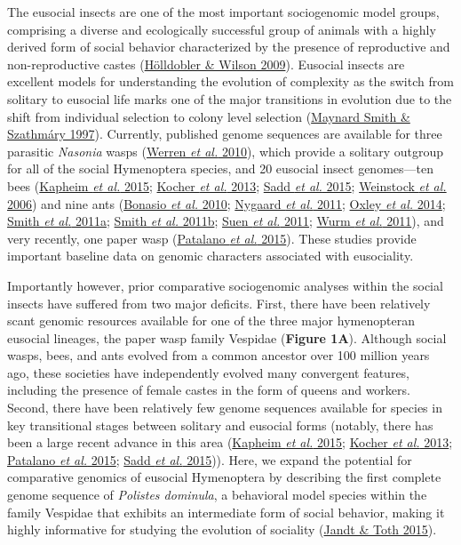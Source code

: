 \documentclass[]{article}
\begin{document}
The eusocial insects are one of the most important sociogenomic model
groups, comprising a diverse and ecologically successful group of
animals with a highly derived form of social behavior characterized by
the presence of reproductive and non-reproductive castes
(\protect\hyperlink{ux5fENREFux5f19}{Hölldobler \& Wilson 2009}).
Eusocial insects are excellent models for understanding the evolution of
complexity as the switch from solitary to eusocial life marks one of the
major transitions in evolution due to the shift from individual
selection to colony level selection
(\protect\hyperlink{ux5fENREFux5f35}{Maynard Smith \& Szathmáry 1997}).
Currently, published genome sequences are available for three parasitic
\emph{Nasonia} wasps (\protect\hyperlink{ux5fENREFux5f70}{Werren
\emph{et al.} 2010}), which provide a solitary outgroup for all of the
social Hymenoptera species, and 20 eusocial insect genomes---ten bees
(\protect\hyperlink{ux5fENREFux5f24}{Kapheim \emph{et al.} 2015};
\protect\hyperlink{ux5fENREFux5f25}{Kocher \emph{et al.} 2013};
\protect\hyperlink{ux5fENREFux5f51}{Sadd \emph{et al.} 2015};
\protect\hyperlink{ux5fENREFux5f69}{Weinstock \emph{et al.} 2006}) and
nine ants (\protect\hyperlink{ux5fENREFux5f5}{Bonasio \emph{et al.}
2010}; \protect\hyperlink{ux5fENREFux5f37}{Nygaard \emph{et al.} 2011};
\protect\hyperlink{ux5fENREFux5f40}{Oxley \emph{et al.} 2014};
\protect\hyperlink{ux5fENREFux5f54}{Smith \emph{et al.} 2011a};
\protect\hyperlink{ux5fENREFux5f55}{Smith \emph{et al.} 2011b};
\protect\hyperlink{ux5fENREFux5f57}{Suen \emph{et al.} 2011};
\protect\hyperlink{ux5fENREFux5f74}{Wurm \emph{et al.} 2011}), and very
recently, one paper wasp (\protect\hyperlink{ux5fENREFux5f43}{Patalano
\emph{et al.} 2015}). These studies provide important baseline data on
genomic characters associated with eusociality.

Importantly however, prior comparative sociogenomic analyses within the
social insects have suffered from two major deficits. First, there have
been relatively scant genomic resources available for one of the three
major hymenopteran eusocial lineages, the paper wasp family Vespidae
(\textbf{Figure 1A}). Although social wasps, bees, and ants evolved from
a common ancestor over 100 million years ago, these societies have
independently evolved many convergent features, including the presence
of female castes in the form of queens and workers. Second, there have
been relatively few genome sequences available for species in key
transitional stages between solitary and eusocial forms (notably, there
has been a large recent advance in this area
(\protect\hyperlink{ux5fENREFux5f24}{Kapheim \emph{et al.} 2015};
\protect\hyperlink{ux5fENREFux5f25}{Kocher \emph{et al.} 2013};
\protect\hyperlink{ux5fENREFux5f43}{Patalano \emph{et al.} 2015};
\protect\hyperlink{ux5fENREFux5f51}{Sadd \emph{et al.} 2015})). Here, we
expand the potential for comparative genomics of eusocial Hymenoptera by
describing the first complete genome sequence of \emph{Polistes
dominula}, a behavioral model species within the family Vespidae that
exhibits an intermediate form of social behavior, making it highly
informative for studying the evolution of sociality
(\protect\hyperlink{ux5fENREFux5f21}{Jandt \& Toth 2015}).
\end{document}
